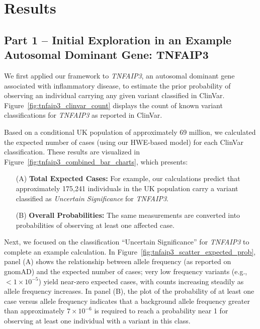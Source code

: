 \documentclass[a4paper,12pt]{article}
\begin{document}
\section{Results}

\subsection{Part 1 -- Initial Exploration in an Example Autosomal Dominant Gene: TNFAIP3}
We first applied our framework to \textit{TNFAIP3}, an autosomal dominant gene associated with inflammatory disease, to estimate the prior probability of observing an individual carrying any given variant classified in ClinVar. Figure~\ref{fig:tnfaip3_clinvar_count} displays the count of known variant classifications for \textit{TNFAIP3} as reported in ClinVar. 

Based on a conditional UK population of approximately 69 million, we calculated the expected number of cases (using our HWE-based model) for each ClinVar classification. These results are visualized in Figure~\ref{fig:tnfaip3_combined_bar_charts}, which presents:
\begin{enumerate}
    \item[(A)] \textbf{Total Expected Cases:} For example, our calculations predict that approximately 175,241 individuals in the UK population carry a variant classified as \textit{Uncertain Significance} for \textit{TNFAIP3}.
    \item[(B)] \textbf{Overall Probabilities:} The same measurements are converted into probabilities of observing at least one affected case.
\end{enumerate}

Next, we focused on the classification “Uncertain Significance” for \textit{TNFAIP3} to complete an example calculation. In Figure~\ref{fig:tnfaip3_scatter_expected_prob}, panel (A) shows the relationship between allele frequency (as reported on gnomAD) and the expected number of cases; very low frequency variants (e.g., \(<1\times10^{-5}\)) yield near-zero expected cases, with counts increasing steadily as allele frequency increases. In panel (B), the plot of the probability of at least one case versus allele frequency indicates that a background allele frequency greater than approximately \(7\times10^{-6}\) is required to reach a probability near 1 for observing at least one individual with a variant in this class.
\end{document}
